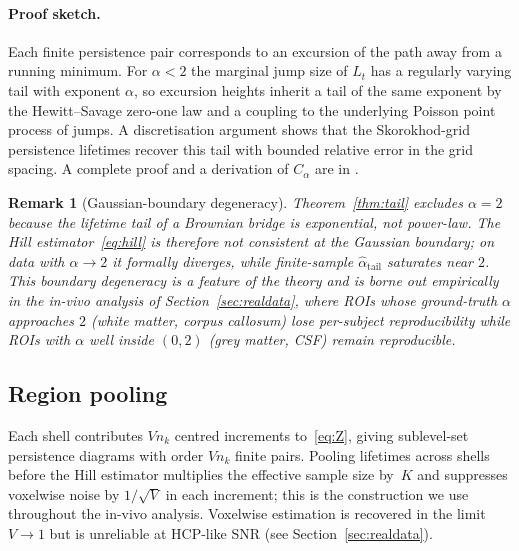 \documentclass[11pt,letterpaper]{article}
\newcommand{\stab}{\alpha}
\newtheorem{remark}[theorem]{Remark}
\begin{document}
\paragraph*{Proof sketch.} Each finite persistence pair corresponds to
an excursion of the path away from a running minimum. For
$\stab<2$ the marginal jump size of $L_t$ has a regularly varying
tail with exponent $\stab$, so excursion heights inherit a tail of
the same exponent by the Hewitt--Savage zero-one law and a coupling
to the underlying Poisson point process of jumps. A discretisation
argument shows that the Skorokhod-grid persistence lifetimes recover
this tail with bounded relative error in the grid spacing. A complete
proof and a derivation of $C_{\stab}$ are in
\citet[Appendix~A]{warioba2026levy}.

\begin{remark}[Gaussian-boundary degeneracy]\label{rem:gaussian-limit}
Theorem~\ref{thm:tail} excludes $\stab=2$ because the lifetime tail
of a Brownian bridge is exponential, not power-law. The Hill
estimator~\eqref{eq:hill} is therefore not consistent at the Gaussian
boundary; on data with $\stab\to 2$ it formally diverges, while
finite-sample $\widehat{\stab}_{\mathrm{tail}}$ saturates near $2$.
This boundary degeneracy is a feature of the theory and is borne out
empirically in the in-vivo analysis of Section~\ref{sec:realdata},
where ROIs whose ground-truth $\stab$ approaches $2$ (white matter,
corpus callosum) lose per-subject reproducibility while ROIs with
$\stab$ well inside $(0,2)$ (grey matter, CSF) remain reproducible.
\end{remark}

\subsection{Region pooling}
Each shell contributes $Vn_k$ centred increments to~\eqref{eq:Z},
giving sublevel-set persistence diagrams with order
$V n_k$ finite pairs. Pooling lifetimes across shells before
the Hill estimator multiplies the effective sample size by~$K$ and
suppresses voxelwise noise by $1/\sqrt{V}$ in each increment; this is
the construction we use throughout the in-vivo analysis. Voxelwise
estimation is recovered in the limit $V\to 1$ but is unreliable at
HCP-like SNR (see Section~\ref{sec:realdata}).
\end{document}
